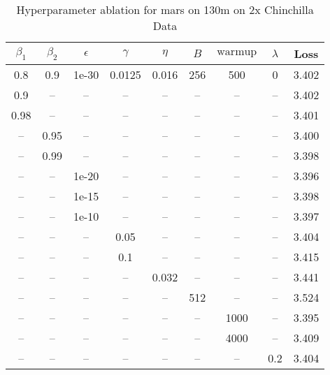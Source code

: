 \begin{table}[h!]
\centering
\caption{Hyperparameter ablation for mars on 130m on 2x Chinchilla Data}
\label{tab:ablation_mars_130m_on_2x_chinchilla_data}
\begin{tabular}{ccccccccc}
\toprule
$\beta_1$ & $\beta_2$ & $\epsilon$ & $\gamma$ & $\eta$ & $B$ & $\mathrm{warmup}$ & $\lambda$ & Loss \\
\midrule
0.8 & 0.9 & 1e-30 & 0.0125 & 0.016 & 256 & 500 & 0 & 3.402 \\
\midrule
0.9 & -- & -- & -- & -- & -- & -- & -- & 3.402 \\
0.98 & -- & -- & -- & -- & -- & -- & -- & 3.401 \\
-- & 0.95 & -- & -- & -- & -- & -- & -- & 3.400 \\
-- & 0.99 & -- & -- & -- & -- & -- & -- & 3.398 \\
-- & -- & 1e-20 & -- & -- & -- & -- & -- & 3.396 \\
-- & -- & 1e-15 & -- & -- & -- & -- & -- & 3.398 \\
-- & -- & 1e-10 & -- & -- & -- & -- & -- & 3.397 \\
-- & -- & -- & 0.05 & -- & -- & -- & -- & 3.404 \\
-- & -- & -- & 0.1 & -- & -- & -- & -- & 3.415 \\
-- & -- & -- & -- & 0.032 & -- & -- & -- & 3.441 \\
-- & -- & -- & -- & -- & 512 & -- & -- & 3.524 \\
-- & -- & -- & -- & -- & -- & 1000 & -- & 3.395 \\
-- & -- & -- & -- & -- & -- & 4000 & -- & 3.409 \\
-- & -- & -- & -- & -- & -- & -- & 0.2 & 3.404 \\
\bottomrule
\end{tabular}
\end{table}

